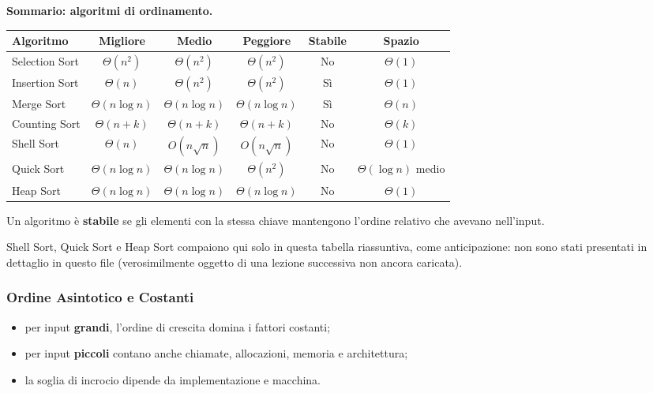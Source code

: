 \documentclass[12pt, a4paper]{article}
\begin{document}
\textbf{Sommario: algoritmi di ordinamento.}

\begin{center}
\small
\begin{tabular}{lccccc}
\toprule
\textbf{Algoritmo} & \textbf{Migliore} & \textbf{Medio} & \textbf{Peggiore} & \textbf{Stabile} & \textbf{Spazio} \\
\midrule
Selection Sort & $\Theta(n^2)$ & $\Theta(n^2)$ & $\Theta(n^2)$ & No & $\Theta(1)$ \\
Insertion Sort & $\Theta(n)$ & $\Theta(n^2)$ & $\Theta(n^2)$ & Sì & $\Theta(1)$ \\
Merge Sort & $\Theta(n\log n)$ & $\Theta(n\log n)$ & $\Theta(n\log n)$ & Sì & $\Theta(n)$ \\
Counting Sort & $\Theta(n+k)$ & $\Theta(n+k)$ & $\Theta(n+k)$ & No & $\Theta(k)$ \\
Shell Sort & $\Theta(n)$ & $O(n\sqrt{n})$ & $O(n\sqrt{n})$ & No & $\Theta(1)$ \\
Quick Sort & $\Theta(n\log n)$ & $\Theta(n\log n)$ & $\Theta(n^2)$ & No & $\Theta(\log n)$ medio \\
Heap Sort & $\Theta(n\log n)$ & $\Theta(n\log n)$ & $\Theta(n\log n)$ & No & $\Theta(1)$ \\
\bottomrule
\end{tabular}
\end{center}

\begin{tcolorbox}[colback=lightergray!10, colframe=tocsec, title=\textbf{Definizione: Stabilità}]
Un algoritmo è \textbf{stabile} se gli elementi con la stessa chiave mantengono l'ordine relativo che avevano nell'input.
\end{tcolorbox}

\begin{tcolorbox}[colback=lightergray!5, colframe=tocsubsec, title=\textbf{Nota}]
Shell Sort, Quick Sort e Heap Sort compaiono qui solo in questa tabella riassuntiva, come anticipazione: non sono stati presentati in dettaglio in questo file (verosimilmente oggetto di una lezione successiva non ancora caricata).
\end{tcolorbox}

\subsubsection{Ordine Asintotico e Costanti}

\begin{itemize}
    \item per input \textbf{grandi}, l'ordine di crescita domina i fattori costanti;
    \item per input \textbf{piccoli} contano anche chiamate, allocazioni, memoria e architettura;
    \item la soglia di incrocio dipende da implementazione e macchina.
\end{itemize}
\end{document}

